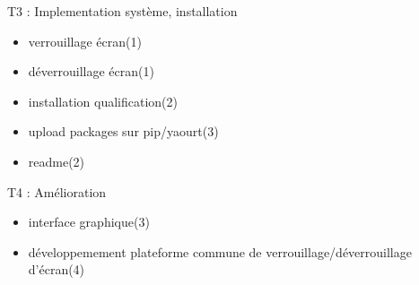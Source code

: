 T3 : Implementation système, installation
\begin{itemize}
  \item{verrouillage écran(1)}
  \item{déverrouillage écran(1)}
  \item{installation qualification(2)}
  \item{upload packages sur pip/yaourt(3)}
  \item{readme(2)}
\end{itemize}

T4 : Amélioration
\begin{itemize}
  \item{interface graphique(3)}
  \item{développemement plateforme commune de verrouillage/déverrouillage
        d’écran(4)}
\end{itemize}
